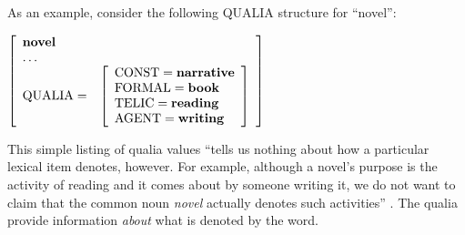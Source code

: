 As an example, consider the following QUALIA structure for ``novel'':
\par\vspace{5mm}
$\left[
\begin{array}{l l}
\textbf{novel} & \\
\mathellipsis & \\
\text{QUALIA} = & \left[ \begin{array}{l}
				\text{CONST}=\textbf{narrative} \\
				\text{FORMAL}=\textbf{book} \\
				\text{TELIC}=\textbf{reading} \\
				\text{AGENT}=\textbf{writing}
				\end{array}\right] \\
\end{array}
\right]$
\par\vspace{5mm}
This simple listing of qualia values ``tells us nothing about how a particular lexical item denotes, however. For example, although a novel's purpose is the activity of reading and it comes about by someone writing it, we do not want to claim that the common noun \emph{novel} actually denotes such activities'' \cite[pg.\ 78]{pustejovsky_generative_1998}. The qualia provide information \emph{about} what is denoted by the word.

\clearpage

